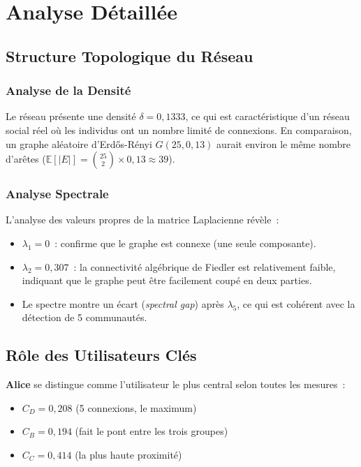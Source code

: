 \documentclass[12pt,a4paper]{article}
\begin{document}
\section{Analyse Détaillée}
\label{sec:analyse}

\subsection{Structure Topologique du Réseau}

\subsubsection{Analyse de la Densité}
Le réseau présente une densité $\delta = 0{,}1333$, ce qui est caractéristique d'un réseau social réel où les individus ont un nombre limité de connexions. En comparaison, un graphe aléatoire d'Erdős-Rényi $G(25, 0{,}13)$ aurait environ le même nombre d'arêtes ($\mathbb{E}[|E|] = \binom{25}{2} \times 0{,}13 \approx 39$).

\subsubsection{Analyse Spectrale}
L'analyse des valeurs propres de la matrice Laplacienne révèle~:
\begin{itemize}
    \item $\lambda_1 = 0$~: confirme que le graphe est connexe (une seule composante).
    \item $\lambda_2 = 0{,}307$~: la connectivité algébrique de Fiedler est relativement faible, indiquant que le graphe peut être facilement coupé en deux parties.
    \item Le spectre montre un écart (\emph{spectral gap}) après $\lambda_5$, ce qui est cohérent avec la détection de 5 communautés.
\end{itemize}

\subsection{Rôle des Utilisateurs Clés}

\textbf{Alice} se distingue comme l'utilisateur le plus central selon toutes les mesures~:
\begin{itemize}
    \item $C_D = 0{,}208$ (5 connexions, le maximum)
    \item $C_B = 0{,}194$ (fait le pont entre les trois groupes)
    \item $C_C = 0{,}414$ (la plus haute proximité)
\end{itemize}
\end{document}
